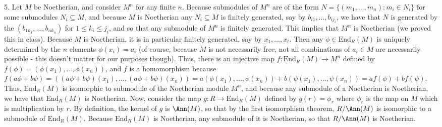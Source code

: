 \documentclass[11pt]{article}
\begin{document}
\num{5.} Let $M$ be Noetherian, and consider $M^n$ for any finite $n$. Because submodules of $M^n$ are of the form $N=\{(m_1,\ldots,m_n):m_i\in N_i\}$ for some submodules $N_i\subseteq M$, and because $M$ is Noetherian any $N_i\subseteq M$ is finitely generated, say by $b_{i1},\ldots,b_{ij_i}$, we have that $N$ is generated by the $(b_{1k_1},\ldots,b_{nk_n})$ for $1\leq k_i\leq j_i$, and so that any submodule of $M^n$ is finitely generated. This implies that $M^n$ is Noetherian (we proved this in class). Because $M$ is Noetherian, it is in particular finitely generated, say by $x_1,\ldots,x_t$. Then any $\phi\in\text{End}_R(M)$ is uniquely determined by the $n$ elements $\phi(x_i)=a_i$ (of course, because $M$ is not necessarily free, not all combinations of $a_i\in M$ are necessarily possible - this doesn't matter for our purposes though). Thus, there is an injective map $f:\text{End}_R(M)\rightarrow M^n$ defined by $f(\phi)=(\phi(x_1),\ldots,\phi(x_n))$, and $f$ is a homomorphism because $f(a\phi+b\psi)=((a\phi+b\psi)(x_1),\ldots,(a\phi+b\psi)(x_n))=a(\phi(x_1),\ldots,\phi(x_n))+b(\psi(x_1),\ldots,\psi(x_n))=af(\phi)+bf(\psi)$. Thus, $\text{End}_R(M)$ is isomorphic to submodule of the Noetherian module $M^n$, and because any submodule of a Noetherian is Noetherian, we have that $\text{End}_R(M)$ is Noetherian. Now, consider the map $g:R\rightarrow\text{End}_R(M)$ defined by $g(r)=\phi_r$ where $\phi_r$ is the map on $M$ which is multiplication by $r$. By definition, the kernel of $g$ is $\Ann(M)$, so that by the first isomorphism theorem, $R/\Ann(M)$ is isomorphic to a submodule of $\text{End}_R(M)$. Because $\text{End}_R(M)$ is Noetherian, any submodule of it is Noetherian, so that $R/\Ann(M)$ is Noetherian.     \\
\end{document}
